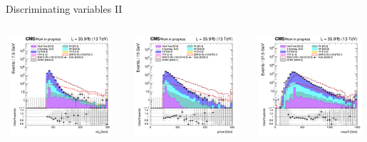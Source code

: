 \documentclass[8pt]{beamer}
\begin{document}
\begin{frame}{Discriminating variables II}
\begin{columns}
\begin{column}{1.09\textwidth}
\begin{block}{}\end{block} \vspace{5pt}
\end{column}
\end{columns} \vspace{-5pt}
\begin{columns}
		\begin{column}{0.33\textwidth}
			\begin{center}
     			\includegraphics[width=1.0\textwidth, height=105pt]{figs/2016/SmearSR-ttDM-scalar100/log_cratio_topCR_ll_mt2ll.png}
    		\end{center}		
		\end{column} 
		\begin{column}{0.33\textwidth}
			\begin{center}
     			\includegraphics[width=1.0\textwidth, height=105pt]{figs/2016/SmearSR-ttDM-scalar100/log_cratio_topCR_ll_METcorrected_pt.png}
    		\end{center}		
		\end{column} 
		\begin{column}{0.33\textwidth}
			\begin{center}
     			\includegraphics[width=1.0\textwidth, height=105pt]{figs/2016/SmearSR-ttDM-scalar100/log_cratio_topCR_ll_massT.png}

\end{center}
\end{column}
\end{columns}
\end{frame}
\end{document}
